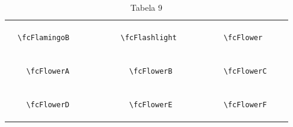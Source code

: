 \documentclass[x11names]{article}
\begin{document}
\begin{table}[H]
\begin{tabular}{|c|c|c|c|c|c|}
		&\multirow{5}{*}{	\fcFlamingoB	[scale=0.64]} & &\multirow{5}{*}{	\fcFlashlight	[scale=0.09]} & &\multirow{5}{*}{	\fcFlower	[scale=0.16]}\\	& & & & & \\	& & & & & \\	\verb|	\fcFlamingoB	| & & \verb|	\fcFlashlight	| & & \verb|	\fcFlower	| & \\	& & & & & \\	& & & & & \\	& & & & & \\	\hline									
		&\multirow{5}{*}{	\fcFlowerA	[scale=0.64]} & &\multirow{5}{*}{	\fcFlowerB	[scale=0.36]} & &\multirow{5}{*}{	\fcFlowerC	[scale=0.36]}\\	& & & & & \\	& & & & & \\	\verb|	\fcFlowerA	| & & \verb|	\fcFlowerB	| & & \verb|	\fcFlowerC	| & \\	& & & & & \\	& & & & & \\	& & & & & \\	\hline									
		&\multirow{5}{*}{	\fcFlowerD	[scale=0.64]} & &\multirow{5}{*}{	\fcFlowerE	[scale=0.09]} & &\multirow{5}{*}{	\fcFlowerF	[scale=0.64]}\\	& & & & & \\	& & & & & \\	\verb|	\fcFlowerD	| & & \verb|	\fcFlowerE	| & & \verb|	\fcFlowerF	| & \\	& & & & & \\	& & & & & \\	& & & & & \\		\hline 	\hline 	\end{tabular}	\caption{	Tabela 9	}\label{	Tab9	}\end{table}
\end{document}
